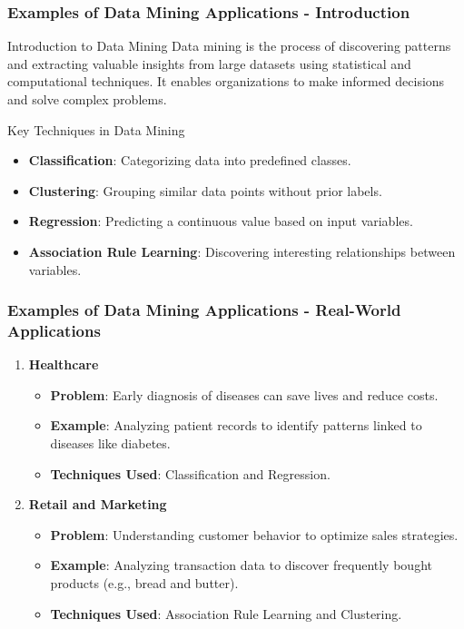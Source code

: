 \documentclass{beamer}
\begin{document}
\begin{frame}[fragile]
    \frametitle{Examples of Data Mining Applications - Introduction}
    \begin{block}{Introduction to Data Mining}
        Data mining is the process of discovering patterns and extracting valuable insights from large datasets using statistical and computational techniques. It enables organizations to make informed decisions and solve complex problems.
    \end{block}

    \begin{block}{Key Techniques in Data Mining}
        \begin{itemize}
            \item \textbf{Classification}: Categorizing data into predefined classes.
            \item \textbf{Clustering}: Grouping similar data points without prior labels.
            \item \textbf{Regression}: Predicting a continuous value based on input variables.
            \item \textbf{Association Rule Learning}: Discovering interesting relationships between variables.
        \end{itemize}
    \end{block}
\end{frame}

\begin{frame}[fragile]
    \frametitle{Examples of Data Mining Applications - Real-World Applications}
    \begin{enumerate}
        \item \textbf{Healthcare} 
        \begin{itemize}
            \item \textbf{Problem}: Early diagnosis of diseases can save lives and reduce costs.
            \item \textbf{Example}: Analyzing patient records to identify patterns linked to diseases like diabetes.
            \item \textbf{Techniques Used}: Classification and Regression.
        \end{itemize}

        \item \textbf{Retail and Marketing} 
        \begin{itemize}
            \item \textbf{Problem}: Understanding customer behavior to optimize sales strategies.
            \item \textbf{Example}: Analyzing transaction data to discover frequently bought products (e.g., bread and butter).
            \item \textbf{Techniques Used}: Association Rule Learning and Clustering.
        \end{itemize}
    \end{enumerate}
\end{frame}
\end{document}
